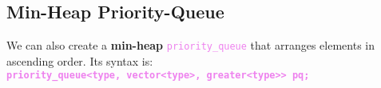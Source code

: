 \subsection{Min-Heap Priority-Queue}
We can also create a \textbf{min-heap} \textcolor{violet}{\texttt{priority\_queue}} that arranges elements in ascending order. Its syntax is:\\
\tab \textbf{\textcolor{violet}{\texttt{priority\_queue<type, vector<type>, greater<type>> pq;}}}

